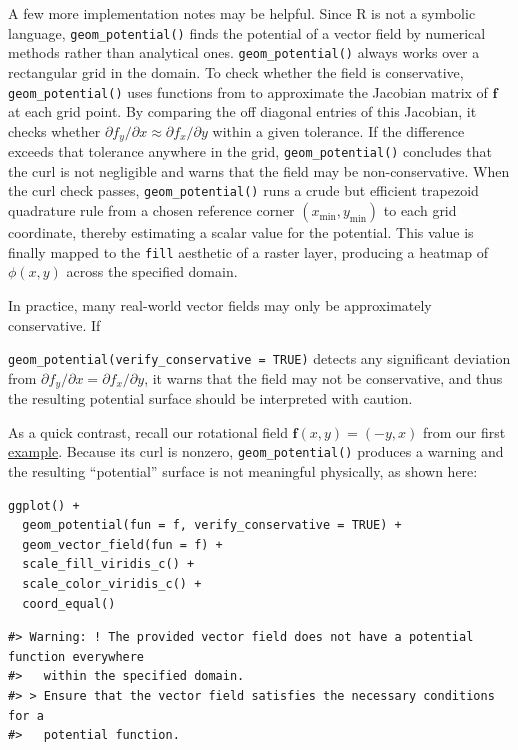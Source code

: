 A few more implementation notes may be helpful. Since R is not a symbolic language, \texttt{geom\_potential()} finds the potential of a vector field by numerical methods rather than analytical ones. \texttt{geom\_potential()} always works over a rectangular grid in the domain. To check whether the field is conservative, \texttt{geom\_potential()} uses functions from  to approximate the Jacobian matrix of \(\mathbf{f}\) at each grid point. By comparing the off diagonal entries of this Jacobian, it checks whether \(\partial f_y/\partial x \approx \partial f_x/\partial y\) within a given tolerance. If the difference exceeds that tolerance anywhere in the grid, \texttt{geom\_potential()} concludes that the curl is not negligible and warns that the field may be non-conservative. When the curl check passes, \texttt{geom\_potential()} runs a crude but efficient trapezoid quadrature rule from a chosen reference corner \((x_{\min}, y_{\min})\) to each grid coordinate, thereby estimating a scalar value for the potential. This value is finally mapped to the \texttt{fill} aesthetic of a raster layer, producing a heatmap of \(\phi(x,y)\) across the specified domain.

In practice, many real-world vector fields may only be approximately conservative. If

\noindent \texttt{geom\_potential(verify\_conservative\ =\ TRUE)} detects any significant deviation from \(\partial f_y/\partial x = \partial f_x/\partial y\), it warns that the field may not be conservative, and thus the resulting potential surface should be interpreted with caution.

As a quick contrast, recall our rotational field \(\mathbf{f}(x,y) = (-y, x)\) from our first \hyperref[sec:plotting-a-vector-field]{example}. Because its curl is nonzero, \texttt{geom\_potential()} produces a warning and the resulting ``potential'' surface is not meaningful physically, as shown here:

\begin{verbatim}
ggplot() +
  geom_potential(fun = f, verify_conservative = TRUE) +
  geom_vector_field(fun = f) +
  scale_fill_viridis_c() +
  scale_color_viridis_c() +
  coord_equal()
\end{verbatim}

\begin{verbatim}
#> Warning: ! The provided vector field does not have a potential function everywhere
#>   within the specified domain.
#> > Ensure that the vector field satisfies the necessary conditions for a
#>   potential function.
\end{verbatim}

